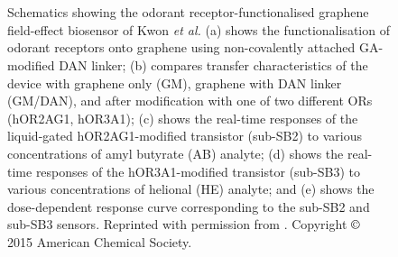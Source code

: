 \documentclass[
  a4paper,
]{scrbook}
\begin{document}
\begin{figure}
\begin{minipage}[t]{0.03\linewidth}
{{}

}

\end{minipage}%
%
\begin{minipage}[t]{0.01\linewidth}

{\centering 

~

}

\end{minipage}%
%
\begin{minipage}[t]{0.45\linewidth}

{\centering 


}

\end{minipage}%
%
\begin{minipage}[t]{0.01\linewidth}

{\centering 

~

}

\end{minipage}%

\caption[Schematics showing the odorant receptor-functionalised graphene
field-effect biosensor of Kwon \emph{et
al.}]{\label{fig-kwon-multiplexed}Schematics showing the odorant
receptor-functionalised graphene field-effect biosensor of Kwon \emph{et
al.} (a) shows the functionalisation of odorant receptors onto graphene
using non-covalently attached GA-modified DAN linker; (b) compares
transfer characteristics of the device with graphene only (GM), graphene
with DAN linker (GM/DAN), and after modification with one of two
different ORs (hOR2AG1, hOR3A1); (c) shows the real-time responses of
the liquid-gated hOR2AG1-modified transistor (sub-SB2) to various
concentrations of amyl butyrate (AB) analyte; (d) shows the real-time
responses of the hOR3A1-modified transistor (sub-SB3) to various
concentrations of helional (HE) analyte; and (e) shows the
dose-dependent response curve corresponding to the sub-SB2 and sub-SB3
sensors. Reprinted with permission from \autocite{Kwon2015}. Copyright
\(\copyright\) 2015 American Chemical Society.}

\end{figure}
\end{document}
